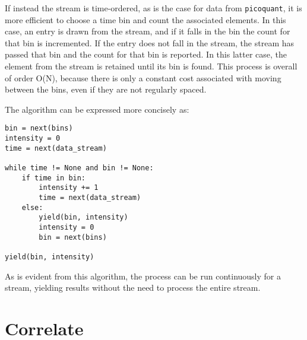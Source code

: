 \documentclass{article}
\newcommand{\picoquant}{\texttt{picoquant}}
\begin{document}
If instead the stream is time-ordered, as is the case for data from \picoquant, it is more efficient to choose a time bin and count the associated elements. In this case, an entry is drawn from the stream, and if it falls in the bin the count for that bin is incremented. If the entry does not fall in the stream, the stream has passed that bin and the count for that bin is reported. In this latter case, the element from the stream is retained until its bin is found. This process is overall of order O(N), because there is only a constant cost associated with moving between the bins, even if they are not regularly spaced.

The algorithm can be expressed more concisely as:
\begin{verbatim}
bin = next(bins)
intensity = 0
time = next(data_stream)

while time != None and bin != None:
    if time in bin:
        intensity += 1
        time = next(data_stream)
    else:
        yield(bin, intensity)        
        intensity = 0
        bin = next(bins)

yield(bin, intensity)
\end{verbatim}

As is evident from this algorithm, the process can be run continuously for a stream, yielding results without the need to process the entire stream.

\section{Correlate}
\label{sec:correlate}
\end{document}

